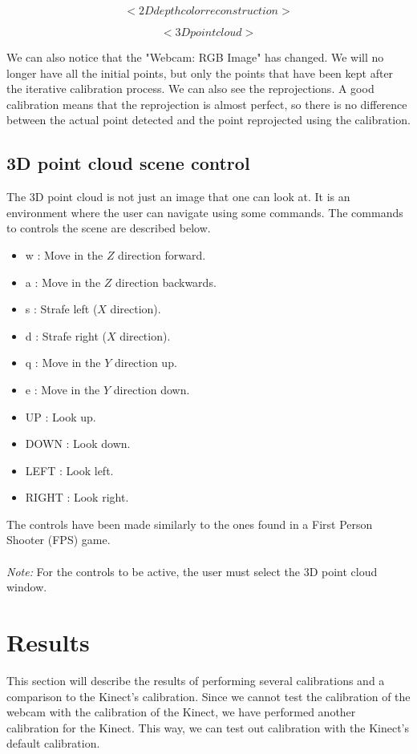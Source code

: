 $$ <2D depth color reconstruction> $$

$$ <3D point cloud> $$

\noindent
We can also notice that the "Webcam: RGB Image" has changed. We will no longer have all the initial points, but only the points that have been kept after the iterative calibration process. We can also see the reprojections. A good calibration means that the reprojection is almost perfect, so there is no difference between the actual point detected and the point reprojected using the calibration. 

\subsection{3D point cloud scene control}
\noindent
The 3D point cloud is not just an image that one can look at. It is an environment where the user can navigate using some commands. The commands to controls the scene are described below.

\begin{itemize}
	\item w : Move in the $Z$ direction forward.
	\item a : Move in the $Z$ direction backwards.
	\item s : Strafe left ($X$ direction).
	\item d : Strafe right ($X$ direction).
	\item q : Move in the $Y$ direction up.
	\item e : Move in the $Y$ direction down.
	\item UP : Look up.
	\item DOWN : Look down.
	\item LEFT : Look left.
	\item RIGHT : Look right. 
\end{itemize}

\noindent
The controls have been made similarly to the ones found in a First Person Shooter (FPS) game. 
\\\\
\emph{Note:} For the controls to be active, the user must select the 3D point cloud window.

\section{Results}
\noindent
This section will describe the results of performing several calibrations and a comparison to the Kinect's calibration. Since we cannot test the calibration of the webcam with the calibration of the Kinect, we have performed another calibration for the Kinect. This way, we can test out calibration with the Kinect's default calibration. 

